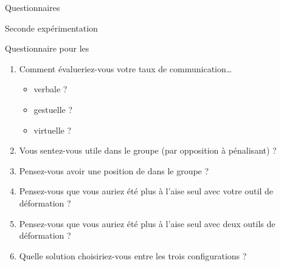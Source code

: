 \documentclass[myfrancais,ngerman,english,french]{mythesis}
\begin{document}
\begin{mychapter}{Questionnaires}
\begin{mysection}{Seconde expérimentation}
\begin{mysubsection}{Questionnaire pour les }
\begin{enumerate}
					\item Comment évalueriez-vous votre taux de communication\dots{}
						\begin{itemize}
							\item verbale ?
							\item gestuelle ?
							\item virtuelle ?
						\end{itemize}
					\item Vous sentez-vous utile dans le groupe (par opposition à pénalisant) ?
					\item Pensez-vous avoir une position de  dans le groupe ?
					\item Pensez-vous que vous auriez été plus à l'aise seul avec votre outil de déformation ?
					\item Pensez-vous que vous auriez été plus à l'aise seul avec deux outils de déformation ?
					\item Quelle solution choisiriez-vous entre les trois configurations ?
				\end{enumerate}


\end{mysubsection}
\end{mysection}
\end{mychapter}
\end{document}
